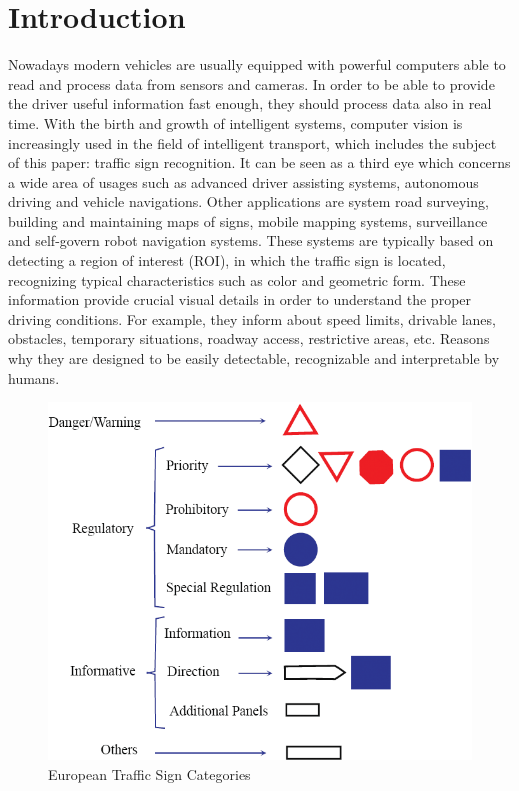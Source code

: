 \documentclass[10pt,twocolumn,letterpaper]{article}
\begin{document}
\section{Introduction}
Nowadays modern vehicles are usually equipped with powerful computers able to read and process data from sensors and cameras. In order to be able to provide the driver useful information fast enough, they should process data also in real time. With the birth and growth of intelligent systems, computer vision is increasingly used in the field of intelligent transport, which includes the subject of this paper: traffic sign recognition. It can be seen as a third eye which concerns a wide area of usages such as advanced driver assisting systems, autonomous driving and vehicle navigations. Other applications are system road surveying, building and maintaining maps of signs, mobile mapping systems, surveillance and self-govern robot navigation systems. These systems are typically based on detecting a region of interest (ROI), in which the traffic sign is located, recognizing typical characteristics such as color and geometric form. These information provide crucial visual details in order to understand the proper driving conditions. For example, they inform about speed limits, drivable lanes, obstacles, temporary situations, roadway access, restrictive areas, etc. Reasons why they are designed to be easily detectable, recognizable and interpretable by humans.
\begin{figure}[h]
	\includegraphics[width=\linewidth]{Res/Immagini/european-traffic-signs.PNG}	
	\caption{European Traffic Sign Categories}
\end{figure}
\end{document}
